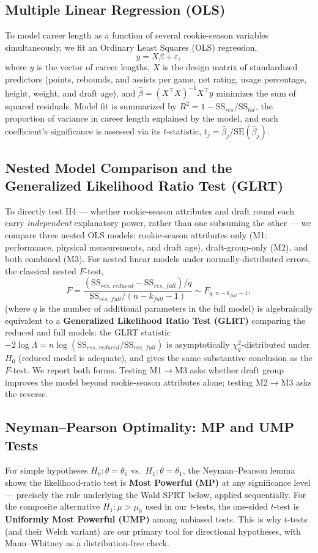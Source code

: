 \documentclass[10pt,twocolumn]{article}
\begin{document}
\subsection{Multiple Linear Regression (OLS)}
To model career length as a function of several rookie-season variables
simultaneously, we fit an Ordinary Least Squares (OLS) regression,
\[
  y = X\beta + \varepsilon,
\]
where $y$ is the vector of career lengths, $X$ is the design matrix of
standardized predictors (points, rebounds, and assists per game, net
rating, usage percentage, height, weight, and draft age), and
$\hat\beta = (X^\top X)^{-1} X^\top y$ minimizes the sum of squared
residuals. Model fit is summarized by $R^2 = 1 - \mathrm{SS}_{res} /
\mathrm{SS}_{tot}$, the proportion of variance in career length explained
by the model, and each coefficient's significance is assessed via its
$t$-statistic, $t_j = \hat\beta_j / \mathrm{SE}(\hat\beta_j)$.

\subsection{Nested Model Comparison and the Generalized Likelihood
Ratio Test (GLRT)}
To directly test H4 --- whether rookie-season attributes and draft
round each carry \textit{independent} explanatory power, rather than
one subsuming the other --- we compare three nested OLS models:
rookie-season attributes only (M1: performance, physical measurements,
and draft age), draft-group-only (M2), and both combined (M3). For
nested linear models under normally-distributed errors, the classical
nested $F$-test,
\[
  F = \frac{(\mathrm{SS}_{res,\,reduced} - \mathrm{SS}_{res,\,full})/q}
           {\mathrm{SS}_{res,\,full}/(n-k_{full}-1)} \sim F_{q,\,n-k_{full}-1},
\]
(where $q$ is the number of additional parameters in the full model)
is algebraically equivalent to a \textbf{Generalized Likelihood Ratio
Test (GLRT)} comparing the reduced and full models: the GLRT statistic
$-2\log\Lambda = n\log(\mathrm{SS}_{res,\,reduced}/\mathrm{SS}_{res,\,full})$
is asymptotically $\chi^2_q$-distributed under $H_0$ (reduced model is
adequate), and gives the same substantive conclusion as the $F$-test.
We report both forms. Testing M1$\to$M3 asks whether draft group
improves the model beyond rookie-season attributes alone; testing
M2$\to$M3 asks the reverse.

\subsection{Neyman--Pearson Optimality: MP and UMP Tests}
For simple hypotheses $H_0:\theta=\theta_0$ vs.\ $H_1:\theta=\theta_1$,
the Neyman--Pearson lemma shows the likelihood-ratio test is
\textbf{Most Powerful (MP)} at any significance level --- precisely
the rule underlying the Wald SPRT below, applied sequentially. For the
composite alternative $H_1:\mu>\mu_0$ used in our $t$-tests, the
one-sided $t$-test is \textbf{Uniformly Most Powerful (UMP)} among
unbiased tests. This is why $t$-tests (and their Welch variant) are our
primary tool for directional hypotheses, with Mann--Whitney as a
distribution-free check.
\end{document}
